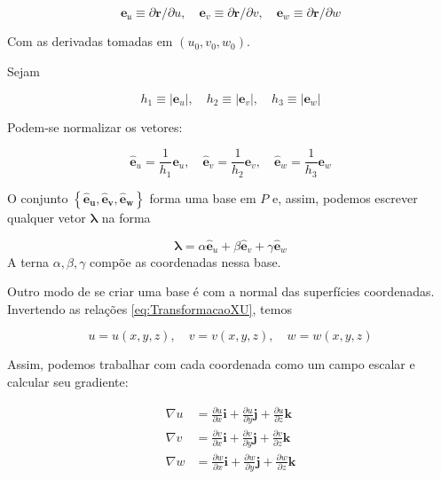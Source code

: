 \begin{equation}\label{eq:VetoresCoordenadosU}
\boxed{\mathbf{e}_{\mathfrak{u}} \equiv \partial \mathbf{r} / \partial u, \quad \mathbf{e}_{v} \equiv \partial \mathbf{r} / \partial v, \quad \mathbf{e}_{w} \equiv \partial \mathbf{r} / \partial w}
\end{equation}


Com as derivadas tomadas em $ (u_0,v_0,w_0) $.

Sejam 

\[
h_{1} \equiv\left|\mathbf{e}_{u}\right|, \quad h_{2} \equiv\left|\mathbf{e}_{v}\right|, \quad h_{3} \equiv\left|\mathbf{e}_{w}\right|
\]

Podem-se normalizar os vetores:

\[
\hat{\mathbf{e}}_{u}=\frac{1}{h_{1}} \mathbf{e}_{u}, \quad \mathbf{\hat { e }}_{v}=\frac{1}{h_{2}} \mathbf{e}_{v}, \quad \mathbf{\hat { e }}_{w}=\frac{1}{h_{3}} \mathbf{e}_{w}
\]

O conjunto $ \left\{\hat{\mathbf{e}}_{\boldsymbol{u}}, \mathbf{\hat { e }}_{\boldsymbol{v}}, \hat{\mathbf{e}}_{\boldsymbol{w}}\right\} $ forma uma base em $ P $ e, assim, podemos escrever qualquer vetor $ \mathbf{\lambda} $ na forma

\[
\boldsymbol{\lambda}=\alpha \hat{\mathbf{e}}_{u}+\beta \hat{\mathbf{e}}_{v}+\gamma \hat{\mathbf{e}}_{w}
\]
A terna $ \alpha,\beta,\gamma $ compõe as coordenadas nessa base.

Outro modo de se criar uma base é com a normal das superfícies coordenadas. Invertendo as relações 
\ref{eq:TransformacaoXU}, temos

\begin{equation}\label{eq:TransformacaoUX}
u=u(x, y, z), \quad v=v(x, y, z), \quad w=w(x, y, z)
\end{equation}

Assim, podemos trabalhar com cada coordenada como um campo escalar e calcular seu gradiente:

\begin{equation}\label{eq:GradienteTransformacaoUX}
\begin{aligned} \nabla u &=\frac{\partial u}{\partial x} \mathbf{i}+\frac{\partial u}{\partial y} \mathbf{j}+\frac{\partial u}{\partial z} \mathbf{k} \\ \nabla v &=\frac{\partial v}{\partial x} \mathbf{i}+\frac{\partial v}{\partial y} \mathbf{j}+\frac{\partial v}{\partial z} \mathbf{k} \\ \nabla w &=\frac{\partial w}{\partial x} \mathbf{i}+\frac{\partial w}{\partial y} \mathbf{j}+\frac{\partial w}{\partial z} \mathbf{k} \end{aligned}
\end{equation}


